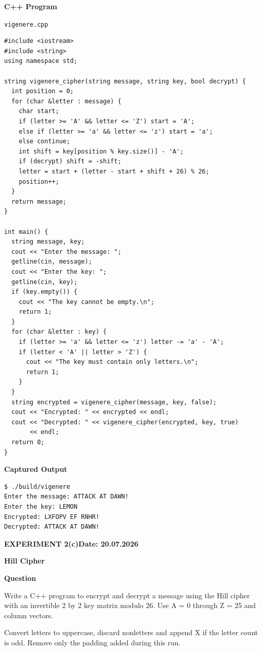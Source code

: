 \documentclass[11pt,a4paper]{article}
\newcommand{\blocktitle}[1]{\Needspace{6\baselineskip}\par\textbf{#1}\par}
\begin{document}
\blocktitle{C++ Program}
{\small\texttt{vigenere.cpp}\par}
\begin{lstlisting}[style=cpp]
#include <iostream>
#include <string>
using namespace std;

string vigenere_cipher(string message, string key, bool decrypt) {
  int position = 0;
  for (char &letter : message) {
    char start;
    if (letter >= 'A' && letter <= 'Z') start = 'A';
    else if (letter >= 'a' && letter <= 'z') start = 'a';
    else continue;
    int shift = key[position % key.size()] - 'A';
    if (decrypt) shift = -shift;
    letter = start + (letter - start + shift + 26) % 26;
    position++;
  }
  return message;
}

int main() {
  string message, key;
  cout << "Enter the message: ";
  getline(cin, message);
  cout << "Enter the key: ";
  getline(cin, key);
  if (key.empty()) {
    cout << "The key cannot be empty.\n";
    return 1;
  }
  for (char &letter : key) {
    if (letter >= 'a' && letter <= 'z') letter -= 'a' - 'A';
    if (letter < 'A' || letter > 'Z') {
      cout << "The key must contain only letters.\n";
      return 1;
    }
  }
  string encrypted = vigenere_cipher(message, key, false);
  cout << "Encrypted: " << encrypted << endl;
  cout << "Decrypted: " << vigenere_cipher(encrypted, key, true)
       << endl;
  return 0;
}
\end{lstlisting}
\par\begin{minipage}{\linewidth}
\textbf{Captured Output}\par
\begin{lstlisting}[style=terminal]
$ ./build/vigenere
Enter the message: ATTACK AT DAWN!
Enter the key: LEMON
Encrypted: LXFOPV EF RNHR!
Decrypted: ATTACK AT DAWN!
\end{lstlisting}
\end{minipage}

\clearpage
{}\label{exp:hill}
{\small\bfseries EXPERIMENT 2(c)\hfill Date: 20.07.2026\par}
{\Large\bfseries Hill Cipher\par}
\vspace{2mm}
\blocktitle{Question}
Write a C++ program to encrypt and decrypt a message using the Hill cipher with an invertible 2 by 2 key matrix modulo 26. Use A = 0 through Z = 25 and column vectors.

Convert letters to uppercase, discard nonletters and append X if the letter count is odd. Remove only the padding added during this run.
\end{document}
